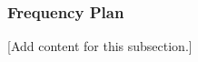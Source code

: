 
\subsubsection{Frequency Plan}
\label{subsubsec:design_2_3_2_frequency_plan}

[Add content for this subsection.]
